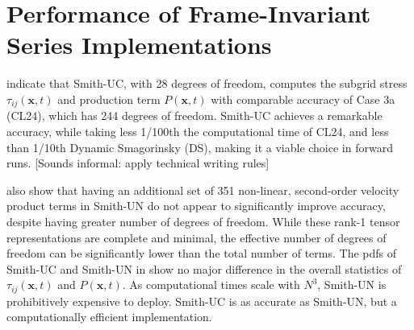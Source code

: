 \section{Performance of Frame-Invariant Series Implementations} 
\label{sec:10B}

%

%


% 
indicate that Smith-UC, 
	with 28 degrees of freedom, 
computes the subgrid stress $\tau_{ij}(\mathbf{x},t)$ 
	and production term $P(\mathbf{x},t)$
	with comparable accuracy of 
Case 3a (CL24), which  has 244 degrees of freedom. 	  
%
%	
		Smith-UC achieves a remarkable accuracy, 
	while taking less 1/100th the computational time of CL24,
	and less than 1/10th Dynamic Smagorinsky (DS),
making it a viable choice in forward runs. 
[Sounds informal: apply technical writing rules]

%
%
 also show that having an additional set of 351 non-linear, second-order velocity product terms in Smith-UN do not appear to significantly improve accuracy, despite having greater number of degrees of freedom.
%
While these rank-1 tensor representations are complete and minimal, the effective number of degrees of freedom can be significantly lower than the total number of terms. 
%
The pdfs of Smith-UC and Smith-UN in  show no major difference in the overall statistics of $\tau_{ij}(\mathbf{x},t)$ and $P(\mathbf{x},t)$. 
%
As computational times scale with $N^3$, Smith-UN is prohibitively expensive to deploy.
%
Smith-UC is as accurate as Smith-UN, but a computationally efficient implementation.  




